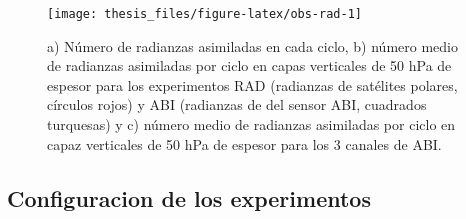 \documentclass[12pt,oneside,a4paper]{reedthesis}
\begin{document}
\begin{figure}
\texttt{[image: thesis\_files/figure-latex/obs-rad-1]} \caption{a) Número de radianzas asimiladas en cada ciclo, b) número medio de radianzas asimiladas por ciclo en capas verticales de 50 hPa de espesor para los experimentos RAD (radianzas de satélites polares, círculos rojos) y ABI (radianzas de del sensor ABI, cuadrados turquesas) y c) número medio de radianzas asimiladas por ciclo en capaz verticales de 50 hPa de espesor para los 3 canales de ABI.}\label{fig:obs-rad}
\end{figure}
\hypertarget{configuracion-de-los-experimentos}{%
\subsection{Configuracion de los experimentos}\label{configuracion-de-los-experimentos}}
\end{document}
